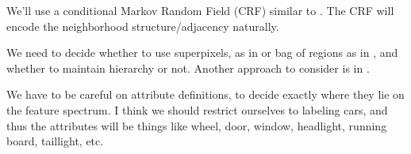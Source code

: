 \documentclass[10pt,twocolumn,letterpaper]{article}
\begin{document}
We'll use a conditional Markov Random Field (CRF) similar to \cite{gould08}.  The CRF will encode the neighborhood structure/adjacency naturally.

We need to decide whether to use superpixels, as in \cite{gould08} or bag of regions as in \cite{gu09, russell06}, and whether to maintain hierarchy or not.  Another approach to consider is in \cite{hoiem05}.

We have to be careful on attribute definitions, to decide exactly where they lie on the feature spectrum.  I think we should restrict ourselves to labeling cars, and thus the attributes will be things like wheel, door, window, headlight, running board, taillight, etc.

%
%
%
%
%
%
%
%
%
\end{document}

